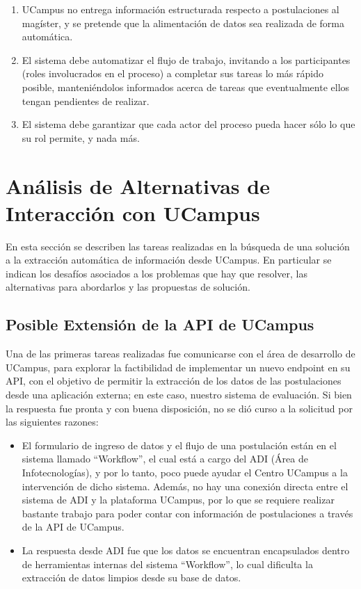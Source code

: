 \begin{enumerate}
    \item UCampus no entrega información estructurada respecto a postulaciones
    al magíster, y se pretende que la alimentación de datos sea realizada de
    forma automática.
    \item El sistema debe automatizar el flujo de trabajo, invitando a los
    participantes (roles involucrados en el proceso) a completar sus tareas lo
    más rápido posible, manteniéndolos informados acerca de tareas que
    eventualmente ellos tengan pendientes de realizar.
    \item El sistema debe garantizar que cada actor del proceso pueda hacer sólo
    lo que su rol permite, y nada más.
\end{enumerate}


\section{Análisis de Alternativas de Interacción con UCampus}

En esta sección se describen las tareas realizadas en la búsqueda de una
solución a la extracción automática de información desde UCampus. En particular
se indican los desafíos asociados a los problemas que hay que resolver, las
alternativas para abordarlos y las propuestas de solución.

\subsection{Posible Extensión de la API de UCampus}

Una de las primeras tareas realizadas fue comunicarse con el área de desarrollo
de UCampus, para explorar la factibilidad de implementar un nuevo endpoint en su
API, con el objetivo de permitir la extracción de los datos de las postulaciones
desde una aplicación externa; en este caso, nuestro sistema de evaluación. Si
bien la respuesta fue pronta y con buena disposición, no se dió curso a la
solicitud por las siguientes razones:

\begin{itemize}
    \item El formulario de ingreso de datos y el flujo de una postulación están en
    el sistema llamado ``Workflow'', el cual está a cargo del ADI (Área de
    Infotecnologías), y por lo tanto, poco puede ayudar el Centro UCampus a la
    intervención de dicho sistema. Además, no hay una conexión directa entre el
    sistema de ADI y la plataforma UCampus, por lo que se requiere realizar bastante
    trabajo para poder contar con información de postulaciones a través de la API de
    UCampus.
    \item La respuesta desde ADI fue que los datos se encuentran encapsulados dentro
    de herramientas internas del sistema ``Workflow'', lo cual dificulta la extracción
    de datos limpios desde su base de datos.
\end{itemize}

